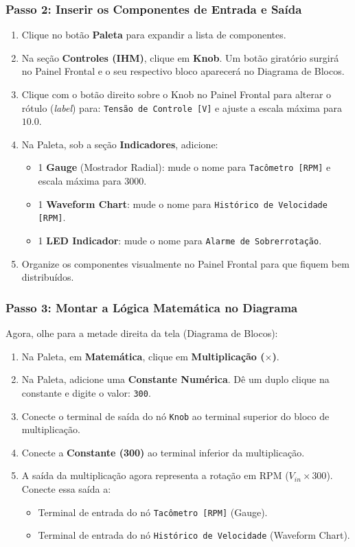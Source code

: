 \documentclass[11pt,a4paper]{article}
\begin{document}
\subsubsection{Passo 2: Inserir os Componentes de Entrada e Saída}
\begin{enumerate}
    \item Clique no botão \textbf{Paleta} para expandir a lista de componentes.
    \item Na seção \textbf{Controles (IHM)}, clique em \textbf{Knob}. Um botão giratório surgirá no Painel Frontal e o seu respectivo bloco aparecerá no Diagrama de Blocos.
    \item Clique com o botão direito sobre o Knob no Painel Frontal para alterar o rótulo (\textit{label}) para: \texttt{Tensão de Controle [V]} e ajuste a escala máxima para $10.0$.
    \item Na Paleta, sob a seção \textbf{Indicadores}, adicione:
    \begin{itemize}
        \item 1 \textbf{Gauge} (Mostrador Radial): mude o nome para \texttt{Tacômetro [RPM]} e escala máxima para $3000$.
        \item 1 \textbf{Waveform Chart}: mude o nome para \texttt{Histórico de Velocidade [RPM]}.
        \item 1 \textbf{LED Indicador}: mude o nome para \texttt{Alarme de Sobrerrotação}.
    \end{itemize}
    \item Organize os componentes visualmente no Painel Frontal para que fiquem bem distribuídos.
\end{enumerate}

\subsubsection{Passo 3: Montar a Lógica Matemática no Diagrama}
Agora, olhe para a metade direita da tela (Diagrama de Blocos):
\begin{enumerate}
    \item Na Paleta, em \textbf{Matemática}, clique em \textbf{Multiplicação ($\times$)}.
    \item Na Paleta, adicione uma \textbf{Constante Numérica}. Dê um duplo clique na constante e digite o valor: \texttt{300}.
    \item Conecte o terminal de saída do nó \texttt{Knob} ao terminal superior do bloco de multiplicação.
    \item Conecte a \textbf{Constante (300)} ao terminal inferior da multiplicação.
    \item A saída da multiplicação agora representa a rotação em RPM ($V_{in} \times 300$). Conecte essa saída a:
    \begin{itemize}
        \item Terminal de entrada do nó \texttt{Tacômetro [RPM]} (Gauge).
        \item Terminal de entrada do nó \texttt{Histórico de Velocidade} (Waveform Chart).
    \end{itemize}
\end{enumerate}
\end{document}
